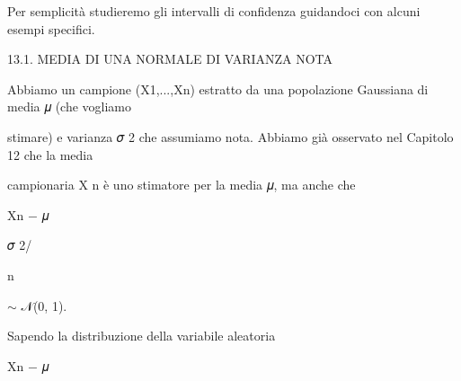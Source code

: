 \documentclass[a4paper,portrait,12pt]{article}
\begin{document}
\begin{flushleft}
Per semplicit\`{a} studieremo gli intervalli di confidenza guidandoci con alcuni esempi specifici.
\end{flushleft}





\begin{flushleft}
13.1. MEDIA DI UNA NORMALE DI VARIANZA NOTA
\end{flushleft}


\begin{flushleft}
Abbiamo un campione (X1,...,Xn) estratto da una popolazione Gaussiana di media 𝜇 (che vogliamo
\end{flushleft}


\begin{flushleft}
stimare) e varianza 𝜎 2 che assumiamo nota. Abbiamo gi\`{a} osservato nel Capitolo 12 che la media
\end{flushleft}


\begin{flushleft}
campionaria X n \`{e} uno stimatore per la media 𝜇, ma anche che
\end{flushleft}





\begin{flushleft}
Xn $-$ 𝜇
\end{flushleft}


\begin{flushleft}
𝜎 2/
\end{flushleft}


\begin{flushleft}
n
\end{flushleft}





\begin{flushleft}
$\sim$ 𝒩(0, 1).
\end{flushleft}





\begin{flushleft}
Sapendo la distribuzione della variabile aleatoria
\end{flushleft}





\begin{flushleft}
Xn $-$ 𝜇
\end{flushleft}
\end{document}

